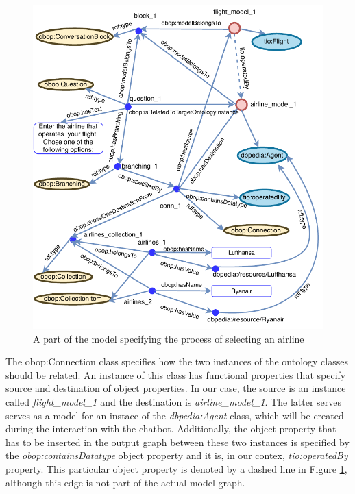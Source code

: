\documentclass[runningheads]{llncs}
\begin{document}
\begin{figure}[H]
  \centering
  \includegraphics[width=\linewidth]{img/branching_schema}
  \caption{A part of the model specifying the process of selecting an airline}
  \label{fig:branching_schema}
\end{figure}
The obop:Connection class specifies how the two instances of the ontology classes should be related. An instance of this class has functional properties that specify source and destination of object properties. In our case, the source is an instance called \textit{flight\_model\_1} and the destination is \textit{airline\_model\_1}. The latter serves serves as a model for an instace of the  \textit{dbpedia:Agent} class, which will be created during the interaction with the chatbot. Additionally, the object property that has to be inserted in the output graph between these two instances is specified by the \textit{obop:containsDatatype} object property and it is, in our contex, \textit{tio:operatedBy} property. This particular object property is denoted by a dashed line in Figure \ref{fig:branching_schema}, although this edge is not part of the actual model graph.    
\end{document}
